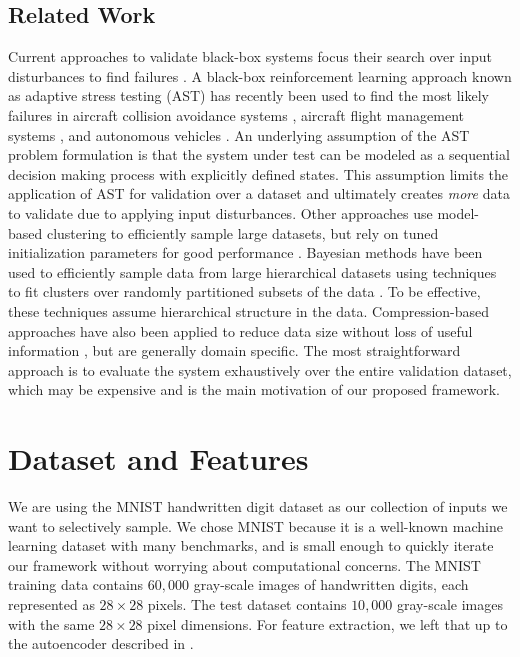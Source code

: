 \subsection{Related Work}
Current approaches to validate black-box systems focus their search over input disturbances to find failures \citep{corso2020survey}.
A black-box reinforcement learning approach known as adaptive stress testing (AST) has recently been used to find the most likely failures in aircraft collision avoidance systems \citep{lee2015adaptive, lee2020adaptive}, aircraft flight management systems \citep{moss2020adaptive}, and autonomous vehicles \citep{koren2018adaptive, koren2019efficient}.
An underlying assumption of the AST problem formulation is that the system under test can be modeled as a sequential decision making process with explicitly defined states.
This assumption limits the application of AST for validation over a dataset and ultimately creates \textit{more} data to validate due to applying input disturbances.
Other approaches use model-based clustering to efficiently sample large datasets, but rely on tuned initialization parameters for good performance \citep{wehrens2004model}.
Bayesian methods have been used to efficiently sample data from large hierarchical datasets using techniques to fit clusters over randomly partitioned subsets of the data \citep{huang2005sampling}.
To be effective, these techniques assume hierarchical structure in the data. 
Compression-based approaches have also been applied to reduce data size without loss of useful information \citep{ferrari2013handling}, but are generally domain specific.
The most straightforward approach is to evaluate the system exhaustively over the entire validation dataset, which may be expensive and is the main motivation of our proposed framework.



\section{Dataset and Features}
We are using the MNIST handwritten digit dataset \citep{lecun2010mnist} as our collection of inputs we want to selectively sample.
We chose MNIST because it is a well-known machine learning dataset with many benchmarks, and is small enough to quickly iterate our framework without worrying about computational concerns.
The MNIST training data contains $60{,}000$ gray-scale images of handwritten digits, each represented as $28\times28$ pixels. The test dataset contains $10{,}000$ gray-scale images with the same $28\times28$ pixel dimensions. For feature extraction, we left that up to the autoencoder described in .



